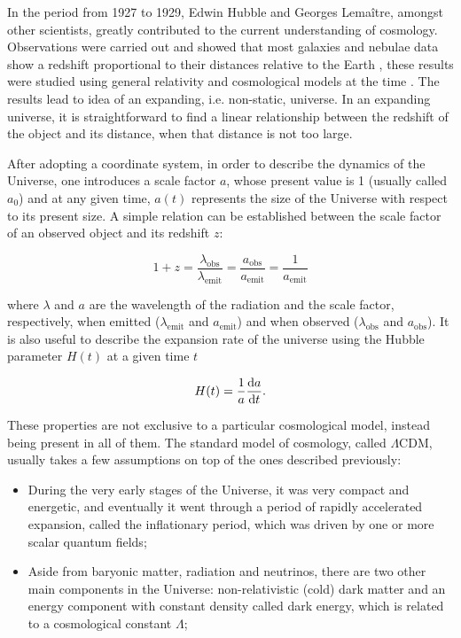 \documentclass[openany,a4paper,12pt,oneside]{book}
\begin{document}
\begin{spacing}{1.5}
In the period from 1927 to 1929, Edwin Hubble and Georges Lemaître, amongst other scientists, greatly contributed to the current understanding of cosmology. Observations were carried out and showed that most galaxies and nebulae data show a redshift proportional to their distances relative to the Earth \cite{hubble}, these results were studied using general relativity and cosmological models at the time \cite{Lemaitre:1927zz}. The results lead to idea of an expanding, i.e. non-static,  universe. In an expanding universe, it is straightforward to find a linear relationship between the redshift of the object and its distance, when that distance is not too large.

After adopting a coordinate system, in order to describe the dynamics of the Universe, one introduces a scale factor $a$, whose present value is 1 (usually called $a_0$) and at any given time, $a(t)$ represents the size of the Universe with respect to its present size. A simple relation can be established between the scale factor of an observed object and its redshift $z$:

\begin{equation}\label{1+z}
    1+z=\frac{\lambda_{\text{obs}}}{\lambda_\text{emit}}=\frac{a_\text{obs}}{a_\text{emit}}=\frac{1}{a_\text{emit}}
\end{equation}

\noindent where $\lambda$ and $a$ are the wavelength of the radiation and the scale factor, respectively, when emitted ($\lambda_\text{emit}$ and $a_\text{emit}$) and when observed ($\lambda_\text{obs}$ and $a_\text{obs}$). It is also useful to describe the expansion rate of the universe using the Hubble parameter $H(t)$ at a given time $t$


\begin{equation}\label{def:H(t)}
    H(t)=\frac{1}{a}\dv{a}{t}.
\end{equation}

These properties are not exclusive to a particular cosmological model, instead being present in all of them. The standard model of cosmology, called $\Lambda$CDM, usually takes a few assumptions on top of the ones described previously:

\begin{itemize}
    \item During the very early stages of the Universe, it was very compact and energetic, and eventually it went through a period of rapidly accelerated expansion, called the inflationary period, which was driven by one or more scalar quantum fields;
    \item Aside from baryonic matter, radiation and neutrinos, there are two other main components in the Universe: non-relativistic (cold) dark matter and an energy component with constant density called dark energy, which is related to a cosmological constant $\Lambda$;
\end{itemize}


\end{spacing}
\end{document}
